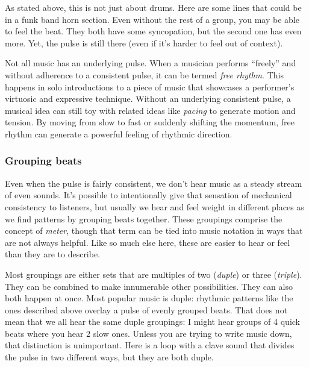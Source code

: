 \documentclass[twoside]{article}
\begin{document}
As stated above, this is not just about drums. Here are some lines that
could be in a funk band horn section. Even without the rest of a group,
you may be able to feel the beat. They both have some syncopation, but
the second one has even more. Yet, the pulse is still there (even if
it's harder to feel out of context).

\hypertarget{example11a}{}

\hypertarget{example11b}{}

Not all music has an underlying pulse. When a musician performs
``freely'' and without adherence to a consistent pulse, it can be termed
\emph{free rhythm}. This happens in solo introductions to a piece of
music that showcases a performer's virtuosic and expressive technique.
Without an underlying consistent pulse, a musical idea can still toy
with related ideas like \emph{pacing} to generate motion and tension. By
moving from slow to fast or suddenly shifting the momentum, free rhythm
can generate a powerful feeling of rhythmic direction.

\hypertarget{grouping-beats}{%
\subsubsection{Grouping beats}\label{grouping-beats}}

Even when the pulse is fairly consistent, we don't hear music as a
steady stream of even sounds. It's possible to intentionally give that
sensation of mechanical consistency to listeners, but usually we hear
and feel weight in different places as we find patterns by grouping
beats together. These groupings comprise the concept of \emph{meter},
though that term can be tied into music notation in ways that are not
always helpful. Like so much else here, these are easier to hear or feel
than they are to describe.

Most groupings are either sets that are multiples of two (\emph{duple})
or three (\emph{triple}). They can be combined to make innumerable other
possibilities. They can also both happen at once. Most popular music is
duple: rhythmic patterns like the ones described above overlay a pulse
of evenly grouped beats. That does not mean that we all hear the same
duple groupings: I might hear groups of 4 quick beats where you hear 2
slow ones. Unless you are trying to write music down, that distinction
is unimportant. Here is a loop with a clave sound that divides the pulse
in two different ways, but they are both duple.

\hypertarget{example12}{}
\end{document}
